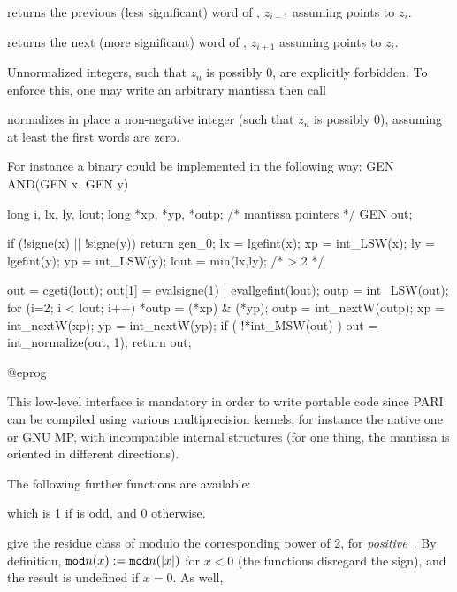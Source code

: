  returns the previous (less significant) word of
, $z_{i-1}$ assuming  points to $z_i$.

 returns the next (more significant) word of ,
$z_{i+1}$ assuming  points to $z_i$.

Unnormalized integers, such that $z_n$ is possibly $0$, are explicitly
forbidden. To enforce this, one may write an arbitrary mantissa then call


\noindent normalizes in place a non-negative integer (such that $z_n$ is
possibly $0$), assuming at least the first  words are zero.

\noindent For instance a binary  could be implemented in the
following way:
\bprog
GEN AND(GEN x, GEN y) {
  long i, lx, ly, lout;
  long *xp, *yp, *outp; /* mantissa pointers */
  GEN out;

  if (!signe(x) || !signe(y)) return gen_0;
  lx = lgefint(x); xp = int_LSW(x);
  ly = lgefint(y); yp = int_LSW(y); lout = min(lx,ly); /* > 2 */

  out = cgeti(lout); out[1] = evalsigne(1) | evallgefint(lout);
  outp = int_LSW(out);
  for (i=2; i < lout; i++)
  {
    *outp = (*xp) & (*yp);
    outp  = int_nextW(outp);
    xp    = int_nextW(xp);
    yp    = int_nextW(yp);
  }
  if ( !*int_MSW(out) ) out = int_normalize(out, 1);
  return out;
}
@eprog

\noindent This low-level interface is mandatory in order to write portable
code since PARI can be compiled using various multiprecision kernels, for
instance the native one or GNU MP, with incompatible internal structures
(for one thing, the mantissa is oriented in different directions).

\noindent The following further functions are available:

 which is 1 if  is odd, and 0 otherwise.






 give the residue class of  modulo the
corresponding power of 2, for \emph{positive}~. By definition,
${\tt mod}n(x) := {\tt mod}n(|x|)$ for $x < 0$ (the functions disregard the
sign), and the result is undefined if $x = 0$. As well,


